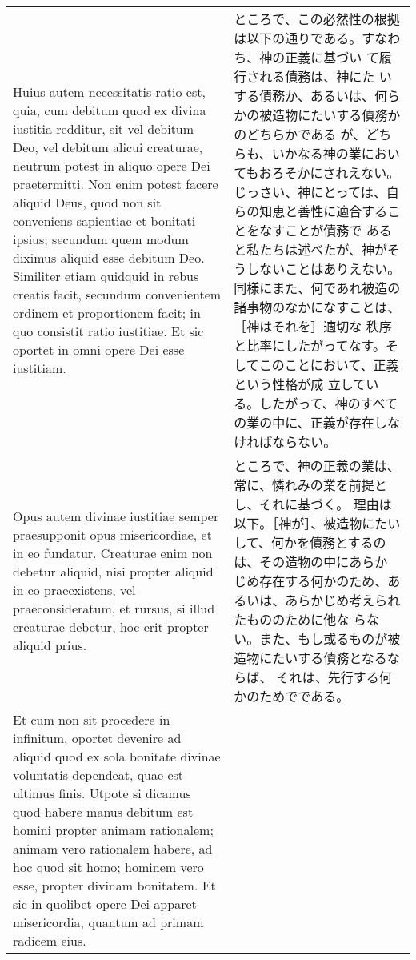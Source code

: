 \documentclass[10pt]{jsarticle} %
\begin{document}
{\begin{longtable}{p{21em}p{21em}}
\\

Huius autem necessitatis ratio est, quia, cum debitum quod ex
divina iustitia redditur, sit vel debitum Deo, vel debitum alicui
creaturae, neutrum potest in aliquo opere Dei praetermitti. Non enim
potest facere aliquid Deus, quod non sit conveniens sapientiae et
bonitati ipsius; secundum quem modum diximus aliquid esse debitum
Deo. 
Similiter etiam quidquid in rebus creatis facit, secundum
convenientem ordinem et proportionem facit; in quo consistit ratio
iustitiae. Et sic oportet in omni opere Dei esse iustitiam.

&

ところで、この必然性の根拠は以下の通りである。すなわち、神の正義に基づい
 て履行される債務は、神にた
 いする債務か、あるいは、何らかの被造物にたいする債務かのどちらかである
 が、どちらも、いかなる神の業においてもおろそかにされえない。
じっさい、神にとっては、自らの知恵と善性に適合することをなすことが債務で
 あると私たちは述べたが、神がそうしないことはありえない。
同様にまた、何であれ被造の諸事物のなかになすことは、［神はそれを］適切な
 秩序と比率にしたがってなす。そしてこのことにおいて、正義という性格が成
 立している。したがって、神のすべての業の中に、正義が存在しなければならない。


\\

 Opus autem
divinae iustitiae semper praesupponit opus misericordiae, et in eo
fundatur. Creaturae enim non debetur aliquid, nisi propter aliquid in eo
praeexistens, vel praeconsideratum, et rursus, si illud creaturae
debetur, hoc erit propter aliquid prius. 


&


ところで、神の正義の業は、常に、憐れみの業を前提とし、それに基づく。
理由は以下。［神が］、被造物にたいして、何かを債務とするのは、その造物の中にあらか
 じめ存在する何かのため、あるいは、あらかじめ考えられたもののために他な
 らない。また、もし或るものが被造物にたいする債務となるならば、
 それは、先行する何かのためでである。


\\


Et cum non sit procedere in
infinitum, oportet devenire ad aliquid quod ex sola bonitate divinae
voluntatis dependeat, quae est ultimus finis. Utpote si dicamus quod
habere manus debitum est homini propter animam rationalem; animam vero
rationalem habere, ad hoc quod sit homo; hominem vero esse, propter
divinam bonitatem. Et sic in quolibet opere Dei apparet misericordia,
quantum ad primam radicem eius. 



\end{longtable}}
\end{document}

